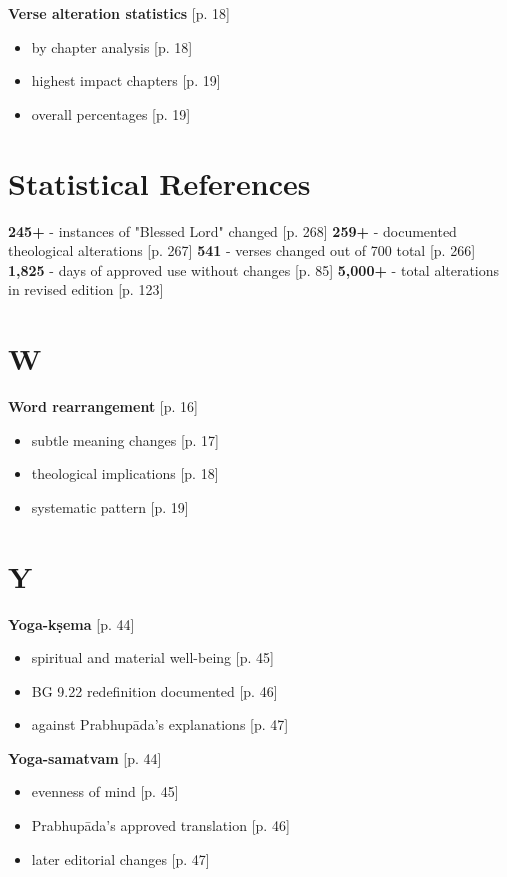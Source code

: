 \documentclass[11pt,twoside]{book}
\begin{document}
\textbf{\textbf{Verse alteration statistics}} {[}p. 18]
\begin{itemize}
\item by chapter analysis [p. 18]
\item highest impact chapters [p. 19]
\item overall percentages [p. 19]
\end{itemize}
\section*{Statistical References}
\label{sec:orgbc47b50}

\textbf{\textbf{245+}} - instances of "Blessed Lord" changed [p. 268]
\textbf{\textbf{259+}} - documented theological alterations [p. 267]
\textbf{\textbf{541}} - verses changed out of 700 total [p. 266]
\textbf{\textbf{1,825}} - days of approved use without changes [p. 85]
\textbf{\textbf{5,000+}} - total alterations in revised edition [p. 123]
\section*{W}
\label{sec:org478d16d}

\textbf{\textbf{Word rearrangement}} {[}p. 16]
\begin{itemize}
\item subtle meaning changes [p. 17]
\item theological implications [p. 18]
\item systematic pattern [p. 19]
\end{itemize}
\section*{Y}
\label{sec:orgee3e053}

\textbf{\textbf{Yoga-kṣema}} {[}p. 44]
\begin{itemize}
\item spiritual and material well-being [p. 45]
\item BG 9.22 redefinition documented [p. 46]
\item against Prabhupāda's explanations [p. 47]
\end{itemize}

\textbf{\textbf{Yoga-samatvam}} {[}p. 44]
\begin{itemize}
\item evenness of mind [p. 45]
\item Prabhupāda's approved translation [p. 46]
\item later editorial changes [p. 47]
\end{itemize}
\end{document}

